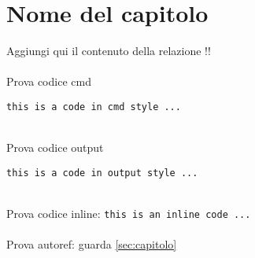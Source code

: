 \section{Nome del capitolo}
\label{sec:capitolo}
Aggiungi qui il contenuto della relazione !!\\
\ \\
Prova codice cmd
\begin{lstlisting}[style=cmd]
 this is a code in cmd style ...
\end{lstlisting}
\ \\
Prova codice output

\begin{lstlisting}[style=output]
 this is a code in output style ...
\end{lstlisting}
\ \\
Prova codice inline: \lstinline[style=cmd]|this is an inline code ...|\\
\ \\
Prova autoref: guarda \autoref{sec:capitolo}